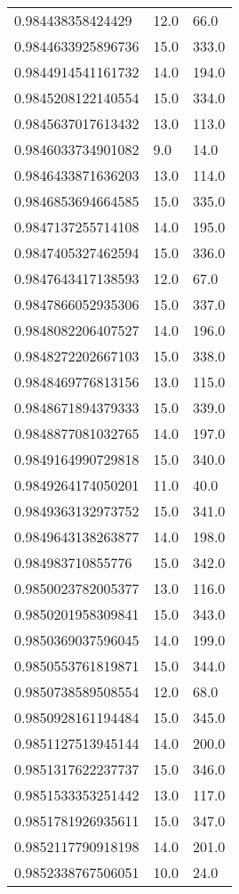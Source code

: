 \begin{center}
\begin{supertabular}[H]{p{0.30\textwidth}p{0.05\textwidth}p{0.05\textwidth}}
0.984438358424429 & 12.0 & 66.0 \\ 
0.9844633925896736 & 15.0 & 333.0 \\ 
0.9844914541161732 & 14.0 & 194.0 \\ 
0.9845208122140554 & 15.0 & 334.0 \\ 
0.9845637017613432 & 13.0 & 113.0 \\ 
0.9846033734901082 & 9.0 & 14.0 \\ 
0.9846433871636203 & 13.0 & 114.0 \\ 
0.9846853694664585 & 15.0 & 335.0 \\ 
0.9847137255714108 & 14.0 & 195.0 \\ 
0.9847405327462594 & 15.0 & 336.0 \\ 
0.9847643417138593 & 12.0 & 67.0 \\ 
0.9847866052935306 & 15.0 & 337.0 \\ 
0.9848082206407527 & 14.0 & 196.0 \\ 
0.9848272202667103 & 15.0 & 338.0 \\ 
0.9848469776813156 & 13.0 & 115.0 \\ 
0.9848671894379333 & 15.0 & 339.0 \\ 
0.9848877081032765 & 14.0 & 197.0 \\ 
0.9849164990729818 & 15.0 & 340.0 \\ 
0.9849264174050201 & 11.0 & 40.0 \\ 
0.9849363132973752 & 15.0 & 341.0 \\ 
0.9849643138263877 & 14.0 & 198.0 \\ 
0.984983710855776 & 15.0 & 342.0 \\ 
0.9850023782005377 & 13.0 & 116.0 \\ 
0.9850201958309841 & 15.0 & 343.0 \\ 
0.9850369037596045 & 14.0 & 199.0 \\ 
0.9850553761819871 & 15.0 & 344.0 \\ 
0.9850738589508554 & 12.0 & 68.0 \\ 
0.9850928161194484 & 15.0 & 345.0 \\ 
0.9851127513945144 & 14.0 & 200.0 \\ 
0.9851317622237737 & 15.0 & 346.0 \\ 
0.9851533353251442 & 13.0 & 117.0 \\ 
0.9851781926935611 & 15.0 & 347.0 \\ 
0.9852117790918198 & 14.0 & 201.0 \\ 
0.9852338767506051 & 10.0 & 24.0 \\ 

\end{supertabular}
\end{center}
